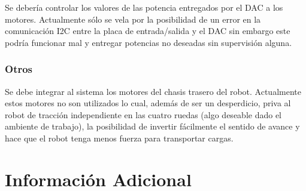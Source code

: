 \documentclass[withindex,glossary]{cam-thesis}
\begin{document}
Se debería controlar los valores de las potencia entregados por el DAC a los motores. Actualmente sólo se vela por la posibilidad de un error en la comunicación I2C entre la placa de entrada/salida y el DAC sin embargo este podría funcionar mal y entregar potencias no deseadas sin supervisión alguna.

\subsection{Otros}
Se debe integrar al sistema los motores del chasis trasero del robot. Actualmente estos motores no son utilizados lo cual, además de ser un desperdicio, priva al robot de tracción independiente en las cuatro ruedas (algo deseable dado el ambiente de trabajo), la posibilidad de invertir fácilmente el sentido de avance y hace que el robot tenga menos fuerza para transportar cargas.



\cleardoublepage
{}
{}

%




\appendix

\chapter{Información Adicional}


\printthesisindex

\listoffigures{}
\listoftables{}
\end{document}
